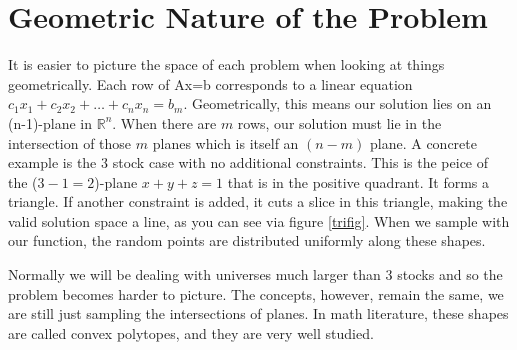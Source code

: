 \documentclass{article}\usepackage{graphicx, color}
\begin{document}
\section*{Geometric Nature of the Problem}

It is easier to picture the space of each problem when looking at things geometrically. Each row of Ax=b corresponds to a linear equation $c_1x_1 + c_2x_2 + \dots + c_n x_n = b_m$. Geometrically, this means our solution lies on an (n-1)-plane in $\mathbb{R}^n$. When there are $m$ rows, our solution must lie in the intersection of those $m$ planes which is itself an $(n-m)$ plane. A concrete example is the 3 stock case with no additional constraints. This is the peice of the ($3-1 = 2$)-plane $x+y+z = 1$ that is in the positive quadrant. It forms a triangle. If another constraint is added, it cuts a slice in this triangle, making the valid solution space a line, as you can see via figure \ref{trifig}. When we sample with our function, the random points are distributed uniformly along these shapes. 

Normally we will be dealing with universes much larger than 3 stocks and so the problem becomes harder to picture. The concepts, however, remain the same, we are still just sampling the intersections of planes. In math literature, these shapes are called convex polytopes, and they are very well studied. 
\end{document}
